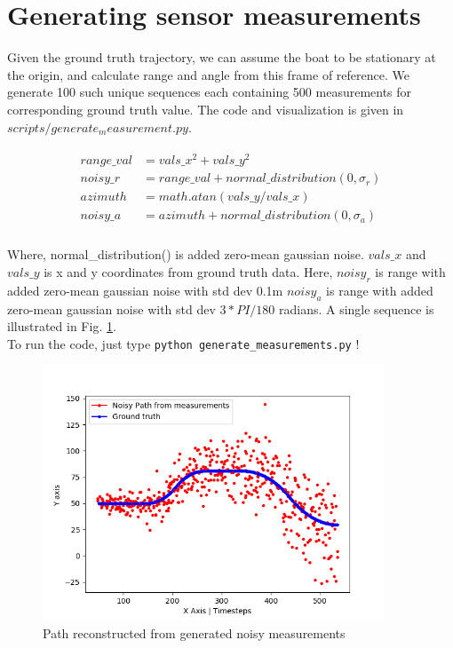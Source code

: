 \documentclass[12pt]{article}
\begin{document}
\section{Generating sensor measurements}

Given the ground truth trajectory, we can assume the boat to be stationary at the origin, and calculate range and angle from this frame of reference.  We generate 100 such unique sequences each containing 500 measurements for corresponding ground truth value. The code and visualization is given in $scripts/generate_measurement.py$.

\begin{eqnarray}
\left.\begin{aligned}
range\_val & = vals\_x^{2} + vals\_y^{2}\\
noisy\_r & = range\_val + normal\_distribution(0, \sigma_{r})\\
azimuth & = math.atan(vals\_y/vals\_x)\\
noisy\_a & = azimuth + normal\_distribution(0, \sigma_{a})\\
\end{aligned}\right.
\end{eqnarray}

Where,  normal\_distribution()  is added zero-mean gaussian noise.  $vals\_x$ and $vals\_y$ is x and y coordinates from ground truth data. Here, $noisy_r$ is range with added zero-mean gaussian noise with std dev 0.1m
$noisy_a$ is range with added zero-mean gaussian noise with std dev $3*PI/180$ radians.
A single sequence is illustrated in Fig. \ref{fig:noisy_path_sample}.
\\
       
To run the code, just type  \texttt{python generate\_measurements.py} !

\begin{figure}[!h]
\centering
\includegraphics[width =4.0in]{../results/noisy_path_sample.png}
\caption{Path reconstructed from generated noisy measurements}
\label{fig:noisy_path_sample}
\end{figure}
\end{document}
